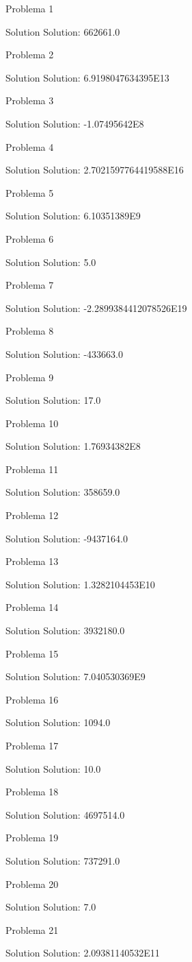 \documentclass{article}
\begin{document}
Problema 1

Solution Solution: 662661.0

Problema 2

Solution Solution: 6.9198047634395E13

Problema 3

Solution Solution: -1.07495642E8

Problema 4

Solution Solution: 2.7021597764419588E16

Problema 5

Solution Solution: 6.10351389E9

Problema 6

Solution Solution: 5.0

Problema 7

Solution Solution: -2.2899384412078526E19

Problema 8

Solution Solution: -433663.0

Problema 9

Solution Solution: 17.0

Problema 10

Solution Solution: 1.76934382E8

Problema 11

Solution Solution: 358659.0

Problema 12

Solution Solution: -9437164.0

Problema 13

Solution Solution: 1.3282104453E10

Problema 14

Solution Solution: 3932180.0

Problema 15

Solution Solution: 7.040530369E9

Problema 16

Solution Solution: 1094.0

Problema 17

Solution Solution: 10.0

Problema 18

Solution Solution: 4697514.0

Problema 19

Solution Solution: 737291.0

Problema 20

Solution Solution: 7.0

Problema 21

Solution Solution: 2.09381140532E11
\end{document}
